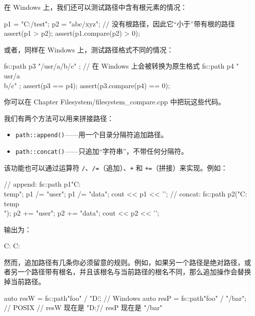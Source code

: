 在 Windows 上，我们还可以测试路径中含有根元素的情况：

\begin{codebox}[cpp]
p1 = "C:/test";
p2 = "abc/xyz"; // 没有根路径，因此它“小于”带有根的路径
assert(p1 > p2);
assert(p1.compare(p2) > 0);
\end{codebox}

或者，同样在 Windows 上，测试路径格式不同的情况：

\begin{codebox}[cpp]
fs::path p3 { "/usr/a/b/c" }; // 在 Windows 上会被转换为原生格式
fs::path p4 { "\\usr/a\\b/c" };
assert(p3 == p4);
assert(p3.compare(p4) == 0);
\end{codebox}

你可以在 Chapter Filesystem/filesystem\_compare.cpp 中把玩这些代码。


我们有两个方法可以用来拼接路径：

\begin{itemize}
\item \texttt{path::append()}——用一个目录分隔符追加路径。
\item \texttt{path::concat()}——只追加“字符串”，不带任何分隔符。
\end{itemize}

该功能也可以通过运算符 \texttt{/}、\texttt{/=}（追加）、\texttt{+} 和 \texttt{+=}（拼接）来实现。例如：

\begin{codebox}[cpp]
// append:
fs::path p1{"C:\\temp"};
p1 /= "user";
p1 /= "data";
cout << p1 << '\n';
// concat:
fs::path p2("C:\\temp\\");
p2 += "user";
p2 += "data";
cout << p2 << '\n';
\end{codebox}

输出为：

\begin{codebox}[cpp]
C:\temp\user\data
C:\temp\userdata
\end{codebox}

然而，追加路径有几条你必须留意的规则。例如，如果另一个路径是绝对路径，或者另一个路径带有根名，并且该根名与当前路径的根名不同，那么追加操作会替换掉当前路径。

\begin{codebox}[cpp]
auto resW = fs::path{"foo"} / "D:\";
// Windows
auto resP = fs::path{"foo"} / "/bar";
// POSIX
// resW 现在是 "D:\"
// resP 现在是 "/bar"
\end{codebox}

